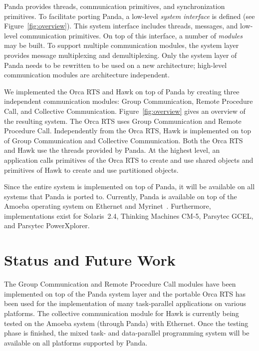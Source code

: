 \documentclass{article}
\begin{document}
Panda provides threads, communication primitives, and synchronization
primitives. To facilitate porting Panda, a low-level \emph{system
interface} is defined (see Figure~\ref{fig:overview}). This system
interface includes threads, messages, and low-level communication
primitives. On top of this interface, a number of \emph{modules} may
be built. To support multiple communication modules, the system layer
provides message multiplexing and demultiplexing. Only the system
layer of Panda needs to be rewritten to be used on a new architecture;
high-level communication modules are architecture independent.

\begin{figure*}[htbp]
  \begin{center}
    \leavevmode
    
    \caption{System overview. }
    \label{fig:overview}
  \end{center}
\end{figure*}

We implemented the Orca RTS and Hawk on top of Panda by creating three
independent communication modules: Group Communication, Remote
Procedure Call, and Collective
Communication. Figure~\ref{fig:overview} gives an overview of the
resulting system. The Orca RTS uses Group Communication and Remote
Procedure Call. Independently from the Orca RTS, Hawk is implemented
on top of Group Communication and Collective Communication. Both the
Orca RTS and Hawk use the threads provided by Panda. At the highest
level, an application calls primitives of the Orca RTS to create and
use shared objects and primitives of Hawk to create and use
partitioned objects.

Since the entire system is implemented on top of Panda, it will be
available on all systems that Panda is ported to. Currently, Panda is
available on top of the Amoeba operating system on Ethernet and
Myrinet~\cite{Boden95-myrinet}. Furthermore, implementations exist for
Solaris~2.4, Thinking Machines CM-5, Parsytec GCEL, and Parsytec
PowerXplorer.

\section{Status and Future Work}
\label{sec:status}

The Group Communication and Remote Procedure Call modules have been
implemented on top of the Panda system layer and the portable Orca RTS
has been used for the implementation of many task-parallel
applications on various platforms. The collective communication module
for Hawk is currently being tested on the Amoeba system (through
Panda) with Ethernet. Once the testing phase is finished, the mixed
task- and data-parallel programming system will be available on all
platforms supported by Panda.
\end{document}
